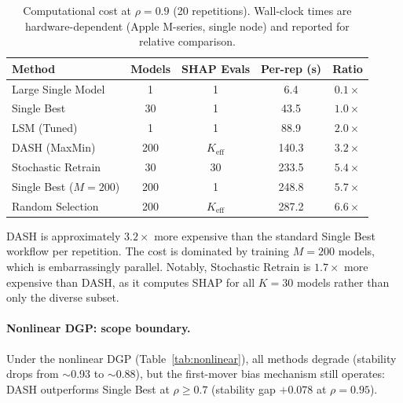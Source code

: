 \documentclass[11pt]{article}
\newcommand{\dash}{\textsc{DASH}}
\newcommand{\rhovar}{\rho}
\begin{document}
\begin{table}[htbp]
\centering
\caption{Computational cost at $\rhovar = 0.9$ (20 repetitions).
Wall-clock times are hardware-dependent (Apple M-series, single node)
and reported for relative comparison.}
\label{tab:cost}
\small
\begin{tabular}{lcccc}
\toprule
\textbf{Method} & \textbf{Models} & \textbf{SHAP Evals} & \textbf{Per-rep (s)} & \textbf{Ratio} \\
\midrule
Large Single Model & 1  & 1  & \phantom{00}6.4 & $0.1\times$ \\
Single Best       & 30  & 1  & \phantom{0}43.5 & $1.0\times$ \\
LSM (Tuned)       & 1   & 1  & \phantom{0}88.9 & $2.0\times$ \\
\dash{} (MaxMin)  & 200 & $K_{\text{eff}}$ & 140.3 & $3.2\times$ \\
Stochastic Retrain & 30 & 30 & 233.5 & $5.4\times$ \\
Single Best ($M{=}200$)  & 200 & 1  & 248.8 & $5.7\times$ \\
Random Selection  & 200 & $K_{\text{eff}}$ & 287.2 & $6.6\times$ \\
\bottomrule
\end{tabular}
\end{table}

\noindent
\dash{} is approximately $3.2\times$ more expensive than the standard
Single Best workflow per repetition. The cost is dominated by training
$M = 200$ models, which is embarrassingly parallel. Notably, Stochastic
Retrain is $1.7\times$ more expensive than \dash{}, as it computes SHAP
for all $K = 30$ models rather than only the diverse subset.

\paragraph{Nonlinear DGP: scope boundary.}
Under the nonlinear DGP (Table~\ref{tab:nonlinear}), all methods
degrade (stability drops from $\sim$0.93 to $\sim$0.88), but the
first-mover bias mechanism still operates: \dash{} outperforms Single
Best at $\rhovar \geq 0.7$ (stability gap $+0.078$ at $\rhovar = 0.95$).
\end{document}
